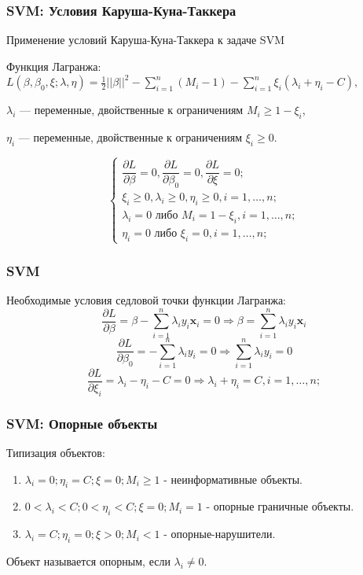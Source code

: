 \documentclass[11pt]{beamer}
\begin{document}
	\begin{frame}
		\frametitle{SVM: Условия Каруша-Куна-Таккера}
		
		Применение условий Каруша-Куна-Таккера к задаче SVM
		
		Функция Лагранжа: $L(\beta, \beta_0, \xi; \lambda, \eta) =  \frac{1}{2} ||\beta||^2 - \sum\limits_{i=1}^{n}(M_i - 1) - \sum\limits_{i=1}^{n} \xi_i(\lambda_i + \eta_i - C),$
		
		$\lambda_i$ --- переменные, двойственные к ограничениям $M_i \geqslant 1 - \xi_i$,
		
		$\eta_i$ --- переменные, двойственные к ограничениям $\xi_i \geqslant 0 $.
		
			$$
		\begin{cases}
			\dfrac{\partial L}{\partial \beta} = 0, \dfrac{\partial L}{\partial \beta_0} = 0, \dfrac{\partial L}{\partial \xi} = 0; \\
			\xi_i \geqslant 0, \lambda_i \geqslant 0, \eta_i \geqslant 0, i = 1, \dotsc, n; \\
			\lambda_i = 0 \text{ либо } M_i = 1 - \xi_i, i = 1, \dotsc, n; \\
			\eta_i = 0 \text{ либо } \xi_i = 0, i = 1, \dotsc, n;
		\end{cases}
		$$
	
	\end{frame}
	\begin{frame}
		\frametitle{SVM}
		Необходимые условия седловой точки функции Лагранжа:
		$$ 	\dfrac{\partial L}{\partial \beta} = \beta - \sum\limits_{i=1}^{n}\lambda_i y_i \bm{x}_i = 0 \Longrightarrow \beta = \sum\limits_{i=1}^{n}\lambda_i y_i \bm{x}_i $$
		$$ 	\dfrac{\partial L}{\partial \beta_0} = - \sum\limits_{i=1}^{n}\lambda_i y_i = 0 \Longrightarrow \sum\limits_{i=1}^{n}\lambda_i y_i = 0 $$
		$$ 	\dfrac{\partial L}{\partial \xi_i} = \lambda_i - \eta_i - C = 0 \Longrightarrow \lambda_i + \eta_i = C, i = 1, \dotsc, n; $$
	
	\end{frame}
	
	\begin{frame}
		\frametitle{SVM: Опорные объекты}
		Типизация объектов:
		\begin{enumerate}
			\item $ \lambda_i = 0; \eta_i = C; \xi = 0; M_i \geqslant 1 $ - неинформативные объекты.
			\item $ 0 < \lambda_i < C; 0 < \eta_i < C; \xi = 0; M_i = 1 $ - опорные граничные объекты.
			\item $ \lambda_i = C; \eta_i = 0; \xi > 0; M_i < 1 $ - опорные-нарушители.
			
		\end{enumerate}
	
	\bigskip
	
	Объект называется опорным, если $\lambda_i \neq 0$.
		
	\end{frame}
\end{document}
